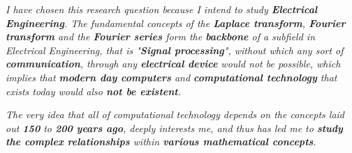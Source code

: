 

\textit{I have chosen this research question because I intend to study \textbf{Electrical Engineering}. The fundamental concepts of the \textbf{Laplace transform}, \textbf{Fourier transform} and the \textbf{Fourier series} form the \textbf{backbone} of a subfield in Electrical Engineering, that is "\textbf{Signal processing}", without which any sort of \textbf{communication}, through any \textbf{electrical device} would not be possible, which implies that \textbf{modern day computers} and \textbf{computational technology} that exists today would also \textbf{not be existent}.}

\textit{The very idea that all of computational technology depends on the concepts laid out \textbf{150} to \textbf{200 years ago}, deeply interests me, and thus has led me to \textbf{study the complex relationships} within \textbf{various mathematical concepts}.}


